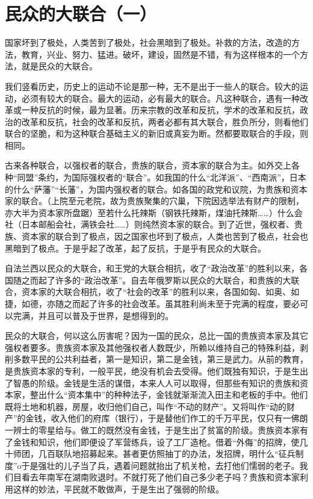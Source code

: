 \section{民众的大联合（一）}



国家坏到了极处，人类苦到了极处，社会黑暗到了极处。补救的方法，改造的方法，教育，兴业、努力、猛进。破坏，建设，固然是不错，有为这样根本的一个方法，就是民众的大联合。

我们竖看历史，历史上的运动不论是那一种，无不是出于一些人的联合。较大的运动，必须有较大的联合。最大的运动，必有最大的联合。凡这种联合，遇有一种改革或一种反抗的时候，最为显著。历来宗教的改革和反抗，学术的改革和反抗，政治的改革和反抗，社会的改革和反抗，两者必都有其大联合，胜负所分，则看他们联合的坚脆，和为这种联合基础主义的新旧或真妄为断。然都要取联合的手段，则相同。

古来各种联合，以强权者的联合，贵族的联合，资本家的联合为主。如外交上各种“同盟”条约，为国际强权者的“联合”。如我国的什么“北洋派”、“西南派”，日本的什么“萨藩”“长藩”，为国内强权者的联合。如各国的政党和议院，为贵族和资本家的联合。（上院至元老院，故为贵族聚集的穴巢，下院因选举法有财产的限制，亦大半为资本家所盘踞）至若什么托辣斯（钢铁托辣斯，煤油托辣斯……）什么会社（日本邮船会社，满铁会社……）则纯然资本家的联合。到了近世，强权者、贵族、资本家的联合到了极点，因之国家也坏到了极点，人类也苦到了极点，社会也黑暗到了极点。于是乎起了改革，起了反抗，于是乎有民众的大联合。

自法兰西以民众的大联合，和王党的大联合相抗，收了“政治改革”的胜利以来，各国随之而起了许多的“政治改革”。自去年俄罗斯以民众的大联合，和贵族的大联合，资本家的大联合相抗，收了“社会的改革”的胜利以来，各国如匈、如奥、如捷，如德，亦随之而起了许多的社会改革。虽其胜利尚未至于完满的程度，要必可以完满，并且可以普及于世界，是想得到的。

民众的大联合，何以这么厉害呢？因为一国的民众，总比一国的贵族资本家及其它强权者要多。贵族资本家及其他强权者人数既少，所赖以维持自己的特殊利益，剥削多数平民的公共利益者，第一是知识，第二是金钱，第三是武力。从前的教育，是贵族资本家的专利，一般平民，绝没有机会去受得。他们既独有知识，于是生出了智愚的阶级。金钱是生活的谋借，本来人人可以取得，但那些有知识的贵族和资本家，整出什么“资本集中”的种种法子，金钱就渐渐流入田主和老板的手中。他们既将土地和机器，房屋，收归他们自己，叫作“不动的财产”。又将叫作“动的财产”的金钱，收入他们的府库（银行），于是替他们作工的千万平民，仅只有一佛朗一辨士的零星给与。做工的既然没有金钱，于是生出了贫富的阶级。贵族资本家有了金钱和知识，他们即便设了军营练兵，设了工厂造枪。借着“外侮”的招牌，使几十师团，几百联队地招募起来。甚者更仿照抽丁的办法，发招牌，明什么“征兵制度”o于是强壮的儿子当了兵，遇着问题就抬出了机关枪，去打他们懦弱的老子。我们目看去年南军在湖南败退时。不就打死了他们自己多少老子吗？贵族和资本家利用这样的妙法，平民就不敢做声，于是生出了强弱的阶级。

